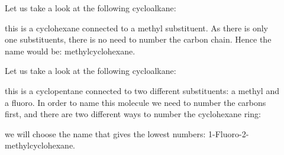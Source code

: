 \documentclass[main.tex]{subfiles}
\begin{document}
\begin{description}
\item[] Let us take a look at the following cycloalkane:
\begin{center} \end{center}
this is a cyclohexane connected to a methyl substituent. As there is only one substituents, there is no need to number the carbon chain. Hence the name would be: methylcyclohexane.

\item[] Let us take a look at the following cycloalkane:
\begin{center} \end{center}
this is a cyclopentane connected to two different substituents: a methyl and a fluoro. In order to name this molecule we need to number the carbons first, and there are two different ways to number the cyclohexane ring:
\A{(-[,-0.3,,,draw=none]\textcolor{red}{1})}
\B{(-[,-0.3,,,draw=none]\textcolor{red}{2})}
\C{(-[,-0.3,,,draw=none]\textcolor{red}{3})}
\D{(-[,-0.3,,,draw=none]\textcolor{red}{4})}
\E{(-[,-0.3,,,draw=none]\textcolor{red}{5})}
\F{(-[,-0.3,,,draw=none]\textcolor{red}{6})}
\newcommand\X[1]{(-[,-0.3,,,draw=none]{#1})}

\begin{center}
\hspace{4.5cm}
\end{center}
we will choose the name that gives the lowest numbers: 1-Fluoro-2-methylcyclohexane.





\end{description}
\end{document}
